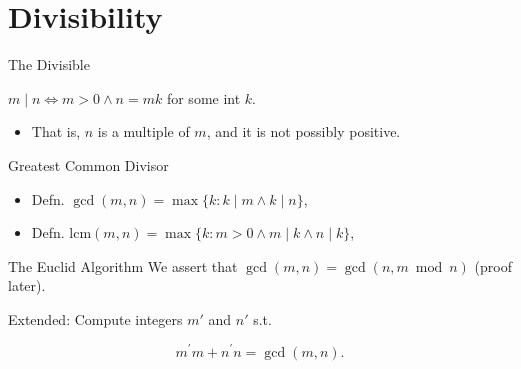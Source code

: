\section{Divisibility}

\begin{frame}{The Divisible}

\begin{definition}[Divisibility]
     $m \mid n \iff m>0 \land n=mk$ for some int $k$. 
\end{definition}

\begin{itemize}
    \item That is, $n$ is a multiple of $m$, and it is not possibly 
    positive. 
\end{itemize}
    
\end{frame}

\begin{frame}{Greatest Common Divisor}
\begin{definition}
    \begin{itemize}
        \item Defn. $\gcd(m, n) = \max\{k: k\mid m\land k\mid n\}$,
        \item Defn. $\text{lcm}(m, n) = \max\{k: m>0 \land m\mid k\land n\mid k\}$,
    \end{itemize}
\end{definition}
    
\end{frame}

\begin{frame}{The Euclid Algorithm}
    We assert that $\gcd(m, n) = \gcd(n , m\bmod n)$ (proof later). 

    Extended: Compute integers $m'$ and $n'$ s.t. 

    $$
    m^{\prime} m+n^{\prime} n=\operatorname{gcd}(m, n) .
    $$



    
\end{frame}

